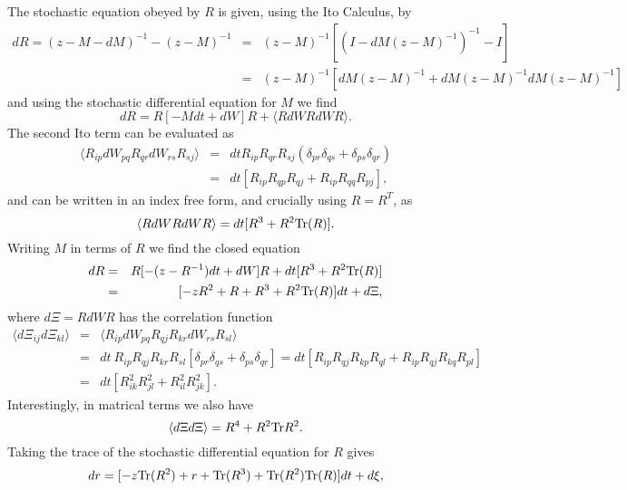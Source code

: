 \documentclass[11pt]{report}
\begin{document}
The stochastic equation obeyed by $R$ is given, using the Ito Calculus, by
\begin{eqnarray}
dR = (z-M-dM)^{-1} - (z-M)^{-1} &=& (z-M)^{-1}\left[ (I - dM (z-M)^{-1})^{-1} -I\right]\nonumber \\
&=& (z-M)^{-1}\left[ dM (z-M)^{-1} + dM (z-M)^{-1}dM (z-M)^{-1}\right]
\end{eqnarray}
and using the stochastic differential equation  for $M$ we find
\begin{equation}
dR = R [-M dt + dW] R + \langle R dW R dW R\rangle.
\end{equation}
The second Ito term can be evaluated as 
\begin{eqnarray}
\langle R_{ip} dW_{pq} R_{qr} dW_{rs} R_{sj}\rangle &=& dt R_{ip}R_{qr}R_{sj}\left(\delta_{pr}\delta_{qs}+\delta_{ps}\delta_{qr}\right) \nonumber \\
&=& dt[R_{ip}R_{qp}R_{qj} + R_{ip}R_{qq}R_{pj}],
\end{eqnarray}
and can be written in an index free form, and crucially using $R=R^T$,  as
\begin{equation}
\langle R dW R dW R\rangle = dt[R^3 + R^2{\rm Tr}(R)].
\end{equation}
Writing $M$ in terms of $R$ we find the closed equation
\begin{eqnarray}
dR &=& R [-(z-R^{-1}) dt + dW] R + dt[R^3 + R^2{\rm Tr}(R)] \nonumber \\
&=& [-zR^2 + R + R^3 + R^2{\rm Tr}(R)] dt + d\Xi,
\end{eqnarray}
where $d\Xi = RdWR$ has the correlation function
\begin{eqnarray}
\langle d\Xi_{ij}d\Xi_{kl} \rangle &=& \langle R_{ip}dW_{pq} R_{qj} R_{kr}dW_{rs} R_{sl}\rangle
\nonumber \\
&=& dt \ R_{ip}R_{qj}R_{kr}R_{sl}\left[ \delta_{pr}\delta_{qs}+\delta_{ps}\delta_{qr}\right]
= dt [R_{ip}R_{qj}R_{kp}R_{ql} + R_{ip}R_{qj}R_{kq}R_{pl}]\nonumber  \\
&=& dt [R^2_{ik}R^2_{jl}  +  R^2_{il}R^2_{jk}].
\end{eqnarray}
Interestingly, in matrical terms we also have
\begin{equation}
\langle d\Xi d\Xi \rangle = R^4 + R^2 {\rm Tr} R^2.
\end{equation}
Taking the trace of the stochastic differential equation for $R$ gives
\begin{equation}
dr = [-z {\rm Tr}(R^2) + r + {\rm Tr}(R^3) + {\rm Tr}(R^2){\rm Tr}(R)] dt + d\xi,
\end{equation}
\end{document}
